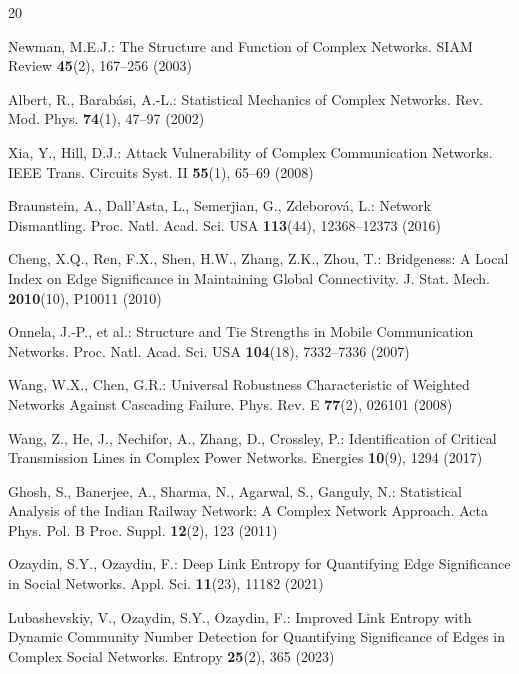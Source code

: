 \documentclass[runningheads,11pt]{article}
\begin{document}
\begin{thebibliography}{20}

Newman, M.E.J.: The Structure and Function of Complex Networks. SIAM Review
\textbf{45}(2), 167--256 (2003)

Albert, R., Barab\'asi, A.-L.: Statistical Mechanics of Complex Networks. Rev.
Mod. Phys. \textbf{74}(1), 47--97 (2002)

Xia, Y., Hill, D.J.: Attack Vulnerability of Complex Communication Networks.
IEEE Trans. Circuits Syst. II \textbf{55}(1), 65--69 (2008)

Braunstein, A., Dall'Asta, L., Semerjian, G., Zdeborov\'a, L.: Network
Dismantling. Proc. Natl. Acad. Sci. USA \textbf{113}(44), 12368--12373 (2016)

Cheng, X.Q., Ren, F.X., Shen, H.W., Zhang, Z.K., Zhou, T.: Bridgeness: A Local
Index on Edge Significance in Maintaining Global Connectivity. J. Stat. Mech.
\textbf{2010}(10), P10011 (2010)

Onnela, J.-P., et al.: Structure and Tie Strengths in Mobile Communication
Networks. Proc. Natl. Acad. Sci. USA \textbf{104}(18), 7332--7336 (2007)

Wang, W.X., Chen, G.R.: Universal Robustness Characteristic of Weighted
Networks Against Cascading Failure. Phys. Rev. E \textbf{77}(2), 026101 (2008)

Wang, Z., He, J., Nechifor, A., Zhang, D., Crossley, P.: Identification of
Critical Transmission Lines in Complex Power Networks. Energies \textbf{10}(9),
1294 (2017)

Ghosh, S., Banerjee, A., Sharma, N., Agarwal, S., Ganguly, N.: Statistical
Analysis of the Indian Railway Network: A Complex Network Approach. Acta Phys.
Pol. B Proc. Suppl. \textbf{12}(2), 123 (2011)

Ozaydin, S.Y., Ozaydin, F.: Deep Link Entropy for Quantifying Edge Significance
in Social Networks. Appl. Sci. \textbf{11}(23), 11182 (2021)

Lubashevskiy, V., Ozaydin, S.Y., Ozaydin, F.: Improved Link Entropy with
Dynamic Community Number Detection for Quantifying Significance of Edges in
Complex Social Networks. Entropy \textbf{25}(2), 365 (2023)


\end{thebibliography}
\end{document}
